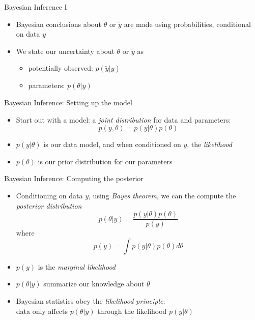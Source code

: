 \documentclass[10pt]{beamer}
\begin{document}
\begin{frame}{Bayesian Inference I}
  \begin{itemize}
  \item Bayesian conclusions about $\theta$ or $\tilde{y}$ are made using probabilities, {\color{uured} conditional on data} $y$
  \pause
  \item We state our uncertainty about $\theta$ or $\tilde{y}$ as 
  \pause
  \begin{itemize}
    \item potentially observed: $p(\tilde{y}|y)$
    \item parameters: $p(\theta|y)$
  \end{itemize}
  \end{itemize}
\end{frame}


\begin{frame}{Bayesian Inference: Setting up the model}
  \begin{itemize}
  \item Start out with a {\color{uured} model}: a \emph{joint distribution} for data and parameters:
  \[
  p(y,\theta) = p(y|\theta) p(\theta)
  \]
  \pause
  \item $p(y|\theta)$ is our data model, and when conditioned on $y$, the \emph{likelihood}
  \pause
  \item $p(\theta)$ is our prior distribution for our parameters
  \end{itemize}
\end{frame}

\begin{frame}{Bayesian Inference: Computing the posterior}
  \begin{itemize}
  \item Conditioning on data $y$, using \emph{Bayes theorem}, we can the compute the \emph{posterior distribution}
  \[
  p(\theta|y) = \frac{p(y|\theta) p(\theta)}{p(y)}
  \]
  where
  \[
  p(y) = \int p(y|\theta) p(\theta) d\theta
  \]
  \pause
  \item $p(y)$ is the \emph{marginal likelihood}
  \pause
  \item $p(\theta|y)$ summarize our knowledge about $\theta$
  \pause
  \item Bayesian statistics obey the \emph{likelihood principle}: \\ data only affects $p(\theta|y)$ through the likelihood $p(y|\theta)$
  \end{itemize}
\end{frame}
\end{document}
